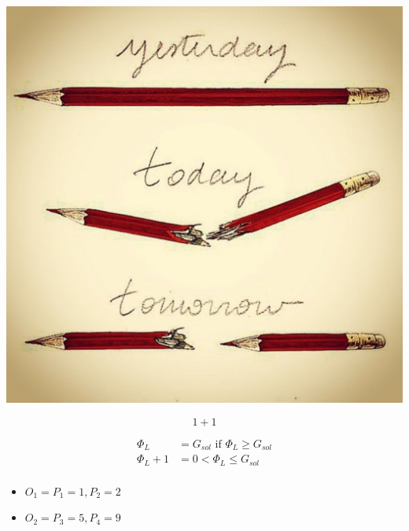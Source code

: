 \documentclass{article}
\begin{document}
\includegraphics{test-image}

\begin{equation}
  1+1
\end{equation}

\begin{equation}
\begin{align}
\Phi_L &= G_{sol} \text{ if } \Phi_L \geq G_{sol}\\
\Phi_L +  1 &= 0 <\Phi_L \leq G_{sol}\\
\end{align}
\end{equation}


\begin{itemize}
\item $O_1 = {P_1 = {1}, P_2 = {2}}$
\item $O_2 = {P_3 = {5}, P_4 = {9}}$
\end{itemize}
\end{document}
